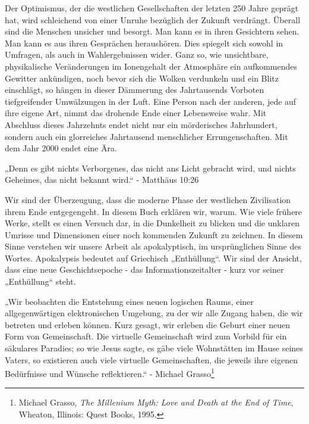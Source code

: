 \documentclass[
  a5paper,
  smalldemyvopaper,10pt,twoside,onecolumn,openright,extrafontsizes,hidelinks]{memoir}
\renewenvironment{quote}%
               {\list{}{\rightmargin=.6cm\leftmargin=.6cm}%
                \itshape \item[]}%
               {\endlist}
\begin{document}
Der Optimismus, der die westlichen Gesellschaften der letzten 250 Jahre
geprägt hat, wird schleichend von einer Unruhe bezüglich der Zukunft
verdrängt. Überall sind die Menschen unsicher und besorgt. Man kann es
in ihren Gesichtern sehen. Man kann es aus ihren Gesprächen heraushören.
Dies spiegelt sich sowohl in Umfragen, als auch in Wahlergebnissen
wider. Ganz so, wie unsichtbare, physikalische Veränderungen im
Ionengehalt der Atmosphäre ein aufkommendes Gewitter ankündigen, noch
bevor sich die Wolken verdunkeln und ein Blitz einschlägt, so hängen in
dieser Dämmerung des Jahrtausends Vorboten tiefgreifender Umwälzungen in
der Luft. Eine Person nach der anderen, jede auf ihre eigene Art, nimmt
das drohende Ende einer Lebensweise wahr. Mit Abschluss dieses
Jahrzehnts endet nicht nur ein mörderisches Jahrhundert, sondern auch
ein glorreiches Jahrtausend menschlicher Errungenschaften. Mit dem Jahr
2000 endet eine Ära.

\begin{quote}
„Denn es gibt nichts Verborgenes, das nicht ans Licht gebracht wird, und
nichts Geheimes, das nicht bekannt wird.`` - Matthäus 10:26
\end{quote}

Wir sind der Überzeugung, dass die moderne Phase der westlichen
Zivilisation ihrem Ende entgegengeht. In diesem Buch erklären wir,
warum. Wie viele frühere Werke, stellt es einen Versuch dar, in die
Dunkelheit zu blicken und die unklaren Umrisse und Dimensionen einer
noch kommenden Zukunft zu zeichnen. In diesem Sinne verstehen wir unsere
Arbeit als apokalyptisch, im ursprünglichen Sinne des Wortes.
Apokalypsis bedeutet auf Griechisch „Enthüllung``. Wir sind der Ansicht,
dass eine neue Geschichtsepoche - das Informationszeitalter - kurz vor
seiner „Enthüllung`` steht.

\begin{quote}
„Wir beobachten die Entstehung eines neuen logischen Raums, einer
allgegenwärtigen elektronischen Umgebung, zu der wir alle Zugang haben,
die wir betreten und erleben können. Kurz gesagt, wir erleben die Geburt
einer neuen Form von Gemeinschaft. Die virtuelle Gemeinschaft wird zum
Vorbild für ein säkulares Paradies; so wie Jesus sagte, es gäbe viele
Wohnstätten im Hause seines Vaters, so existieren auch viele virtuelle
Gemeinschaften, die jeweils ihre eigenen Bedürfnisse und Wünsche
reflektieren.`` - Michael Grasso\footnote{Michael Grasso, \emph{The
  Millenium Myth: Love and Death at the End of Time}, Wheaton, Illinois:
  Quest Books, 1995.}
\end{quote}
\end{document}
